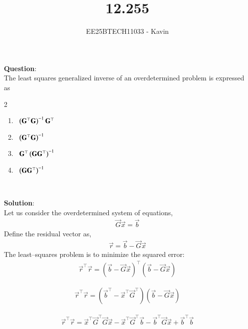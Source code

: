 \documentclass[journal]{IEEEtran}
\begin{document}

\vspace{3cm}

\title{12.255}
\author{EE25BTECH11033 - Kavin}
{\let\newpage\relax\maketitle}

\renewcommand{\thefigure}{\theenumi}
\renewcommand{\thetable}{\theenumi}
\setlength{\intextsep}{10pt} %
\textbf{Question}:\\
The least squares generalized inverse of an overdetermined problem is expressed as  


\begin{multicols}{2}
\begin{enumerate}
	\item \ $\left(\mathbf{G}^\top \mathbf{G}\right)^{-1} \mathbf{G}^\top$  
	\item \ $\left(\mathbf{G}^\top \mathbf{G}\right)^{-1}$  
	\item \ $\mathbf{G}^\top \left(\mathbf{G} \mathbf{G}^\top\right)^{-1} $ 
	\item \ $\left(\mathbf{G} \mathbf{G}^\top\right)^{-1}$  
\end{enumerate}
\end{multicols}\\    
\bigskip

\textbf{Solution}:\\
Let us consider the overdetermined system of equations,
\begin{align}
\vec{G}\vec{x} = \vec{b}
\end{align}
Define the residual vector as,
\begin{align}
\vec{r} = \vec{b} - \vec{G}\vec{x}
\end{align}
The least--squares problem is to minimize the squared error:
\begin{align}
\vec{r}^{\top} \vec{r} = (\vec{b} - \vec{G}\vec{x})^{\top}(\vec{b} - \vec{G}\vec{x})
\end{align}

\begin{align}
\vec{r}^{\top} \vec{r}= (\vec{b} ^{\top} - \vec{x}^{\top}\vec{G}^{\top})(\vec{b} - \vec{G}\vec{x})
\end{align}

\begin{align}
\vec{r}^{\top} \vec{r}= \vec{x}^{\top}\vec{G}^{\top}\vec{G}\vec{x} - \vec{x}^{\top}\vec{G}^{\top}\vec{b} - \vec{b} ^{\top}\vec{G}\vec{x} + \vec{b} ^{\top}\vec{b} 
\end{align}
\end{document}
